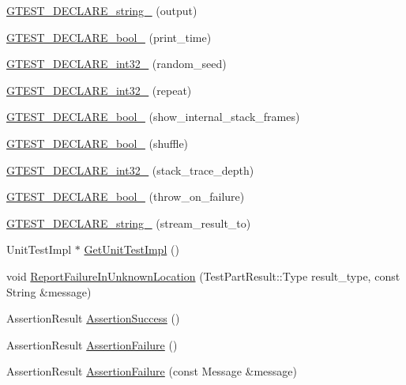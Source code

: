 \begin{DoxyCompactItemize}
\item 
\hyperlink{namespacetesting_a0ad617a0f81de7dfb35c740f80d5812c}{\-G\-T\-E\-S\-T\-\_\-\-D\-E\-C\-L\-A\-R\-E\-\_\-string\-\_\-} (output)
\item 
\hyperlink{namespacetesting_ab8901f732d0e87e196184b5abac68bc9}{\-G\-T\-E\-S\-T\-\_\-\-D\-E\-C\-L\-A\-R\-E\-\_\-bool\-\_\-} (print\-\_\-time)
\item 
\hyperlink{namespacetesting_af66db99ad0d7a1453366804a03d887d6}{\-G\-T\-E\-S\-T\-\_\-\-D\-E\-C\-L\-A\-R\-E\-\_\-int32\-\_\-} (random\-\_\-seed)
\item 
\hyperlink{namespacetesting_a797265979cd4ed202c63419b29d26b9a}{\-G\-T\-E\-S\-T\-\_\-\-D\-E\-C\-L\-A\-R\-E\-\_\-int32\-\_\-} (repeat)
\item 
\hyperlink{namespacetesting_a2835c1783d75ac51afa600506ff5fff3}{\-G\-T\-E\-S\-T\-\_\-\-D\-E\-C\-L\-A\-R\-E\-\_\-bool\-\_\-} (show\-\_\-internal\-\_\-stack\-\_\-frames)
\item 
\hyperlink{namespacetesting_adba569244bbc9a07221d1abc81ea01dc}{\-G\-T\-E\-S\-T\-\_\-\-D\-E\-C\-L\-A\-R\-E\-\_\-bool\-\_\-} (shuffle)
\item 
\hyperlink{namespacetesting_a718dcc037ef803268c49c7db88f776f8}{\-G\-T\-E\-S\-T\-\_\-\-D\-E\-C\-L\-A\-R\-E\-\_\-int32\-\_\-} (stack\-\_\-trace\-\_\-depth)
\item 
\hyperlink{namespacetesting_a2174553b8afb7450fbebf56c4cf64439}{\-G\-T\-E\-S\-T\-\_\-\-D\-E\-C\-L\-A\-R\-E\-\_\-bool\-\_\-} (throw\-\_\-on\-\_\-failure)
\item 
\hyperlink{namespacetesting_a88a6f5699cc1ed3b8b24db866dff7d20}{\-G\-T\-E\-S\-T\-\_\-\-D\-E\-C\-L\-A\-R\-E\-\_\-string\-\_\-} (stream\-\_\-result\-\_\-to)
\item 
\-Unit\-Test\-Impl $\ast$ \hyperlink{namespacetesting_1_1internal_a3ae874a4030c4aa27d77d67bf08d9e1d}{\-Get\-Unit\-Test\-Impl} ()
\item 
void \hyperlink{namespacetesting_1_1internal_a544a5c0a7bc19f664d434be72ecbdbfa}{\-Report\-Failure\-In\-Unknown\-Location} (\-Test\-Part\-Result\-::\-Type result\-\_\-type, const \-String \&message)
\item 
\-Assertion\-Result \hyperlink{namespacetesting_a6941f23b3ce400dec4d2388cb466271c}{\-Assertion\-Success} ()
\item 
\-Assertion\-Result \hyperlink{namespacetesting_ac0c2a038d9ae21e130904675757fd5f3}{\-Assertion\-Failure} ()
\item 
\-Assertion\-Result \hyperlink{namespacetesting_a94c431f935a5149cafc9872ac0e711a9}{\-Assertion\-Failure} (const \-Message \&message)

\end{DoxyCompactItemize}
